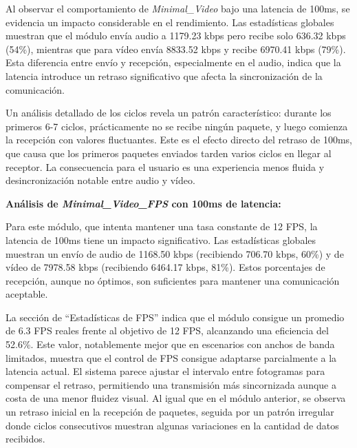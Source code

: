 Al observar el comportamiento de \textit{Minimal\_Video} bajo una latencia de 100ms, se evidencia un impacto considerable en el rendimiento. Las estadísticas globales muestran que el módulo envía audio a 1179.23 kbps pero recibe solo 636.32 kbps (54\%), mientras que para vídeo envía 8833.52 kbps y recibe 6970.41 kbps (79\%). Esta diferencia entre envío y recepción, especialmente en el audio, indica que la latencia introduce un retraso significativo que afecta la sincronización de la comunicación.
\vspace{\baselineskip}

Un análisis detallado de los ciclos revela un patrón característico: durante los primeros 6-7 ciclos, prácticamente no se recibe ningún paquete, y luego comienza la recepción con valores fluctuantes. Este es el efecto directo del retraso de 100ms, que causa que los primeros paquetes enviados tarden varios ciclos en llegar al receptor. La consecuencia para el usuario es una experiencia menos fluida y desincronización notable entre audio y vídeo.

\vspace{\baselineskip}

\textbf{Análisis de \textit{Minimal\_Video\_FPS} con 100ms de latencia:}
\vspace{\baselineskip}

Para este módulo, que intenta mantener una tasa constante de 12 FPS, la latencia de 100ms tiene un impacto significativo. Las estadísticas globales muestran un envío de audio de 1168.50 kbps (recibiendo 706.70 kbps, 60\%) y de vídeo de 7978.58 kbps (recibiendo 6464.17 kbps, 81\%). Estos porcentajes de recepción, aunque no óptimos, son suficientes para mantener una comunicación aceptable.
\vspace{\baselineskip}

La sección de ``Estadísticas de FPS'' indica que el módulo consigue un promedio de 6.3 FPS reales frente al objetivo de 12 FPS, alcanzando una eficiencia del 52.6\%. Este valor, notablemente mejor que en escenarios con anchos de banda limitados, muestra que el control de FPS consigue adaptarse parcialmente a la latencia actual. El sistema parece ajustar el intervalo entre fotogramas para compensar el retraso, permitiendo una transmisión más sincornizada aunque a costa de una menor fluidez visual. Al igual que en el módulo anterior, se observa un retraso inicial en la recepción de paquetes, seguida por un patrón irregular donde ciclos consecutivos muestran algunas variaciones en la cantidad de datos recibidos.

